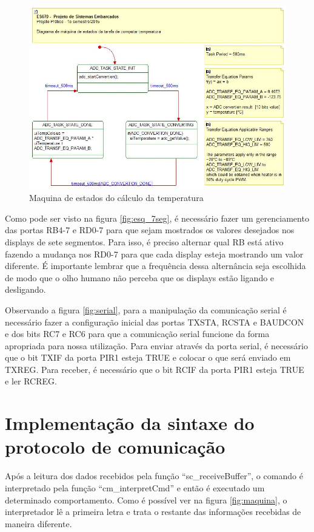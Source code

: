 \documentclass{article}
\begin{document}
\begin{figure}[H]
	\centering
	\includegraphics[width=0.9\linewidth]{maq_temperatura}
	\caption{Maquina de estados do cálculo da temperatura}
	\label{fig:maq_temperatura}
\end{figure}

Como pode ser visto na figura \ref{fig:esq_7seg}, é necessário fazer um gerenciamento das portas RB4-7 e RD0-7 para que sejam mostrados os valores desejados nos displays de sete segmentos. Para isso, é preciso alternar qual RB está ativo fazendo a mudança nos RD0-7 para que cada display esteja mostrando um valor diferente. É importante lembrar que a frequência dessa alternância seja escolhida de modo que o olho humano não perceba que os displays estão ligando e desligando.

Observando a figura \ref{fig:serial}, para a manipulação da comunicação serial é necessário fazer a configuração inicial das portas TXSTA, RCSTA e BAUDCON e dos bits RC7 e RC6 para que a comunicação serial funcione da forma apropriada para nossa utilização.  Para enviar através da porta serial, é necessário que o bit TXIF da porta PIR1 esteja TRUE e colocar o que será enviado em TXREG. Para receber, é necessário que o bit RCIF da porta PIR1 esteja TRUE e ler RCREG.

\section{Implementação da sintaxe do protocolo de comunicação}

Após a leitura dos dados recebidos pela função ``sc\_receiveBuffer'', o comando é interpretado pela função ``cm\_interpretCmd'' e então é executado um determinado comportamento. Como é possível ver na figura \ref{fig:maquina}, o interpretador lê a primeira letra e trata o restante das informações recebidas de maneira diferente.
\end{document}
